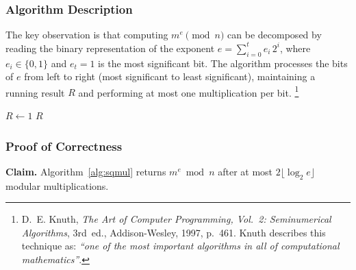 \subsubsection*{Algorithm Description}

The key observation is that computing $m^e \pmod{n}$ can be decomposed by reading the
binary representation of the exponent $e = \sum_{i=0}^{t} e_i \, 2^i$, where
$e_i \in \{0,1\}$ and $e_t = 1$ is the most significant bit. The algorithm processes
the bits of $e$ from left to right (most significant to least significant), maintaining
a running result $R$ and performing at most one multiplication per bit.%
\footnote{D.~E. Knuth, \textit{The Art of Computer Programming, Vol.~2: Seminumerical
Algorithms}, 3rd~ed., Addison-Wesley, 1997, p.~461.
Knuth describes this technique as: \textit{``one of the most important algorithms
in all of computational mathematics''}.}

\begin{algorithm}[H]
\caption{Square-and-Multiply (Left-to-Right Binary Exponentiation)}
\label{alg:sqmul}
$R \gets 1$\;
\Return $R$\;
\end{algorithm}

\subsubsection*{Proof of Correctness}

\textbf{Claim. }Algorithm~\ref{alg:sqmul} returns $m^e \bmod n$ after at most $2\lfloor\log_2 e\rfloor$
modular multiplications.


